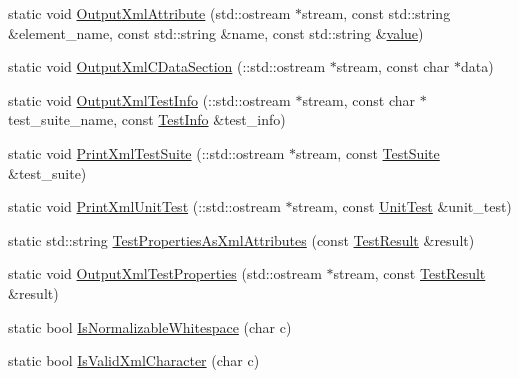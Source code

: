 \begin{DoxyCompactItemize}
static void \mbox{\hyperlink{classtesting_1_1internal_1_1_xml_unit_test_result_printer_a3ace4e5b1866dc7755079e609f046f83}{Output\+Xml\+Attribute}} (std\+::ostream $\ast$stream, const std\+::string \&element\+\_\+name, const std\+::string \&name, const std\+::string \&\mbox{\hyperlink{_obj__test_2lib_2googletest-master_2googlemock_2test_2gmock-matchers__test_8cc_a337b8a670efc0b086ad3af163f3121b6}{value}})
\item 
static void \mbox{\hyperlink{classtesting_1_1internal_1_1_xml_unit_test_result_printer_a0b6f9682a642f88bb779a4f744ad3d92}{Output\+Xml\+C\+Data\+Section}} (\+::std\+::ostream $\ast$stream, const char $\ast$data)
\item 
static void \mbox{\hyperlink{classtesting_1_1internal_1_1_xml_unit_test_result_printer_acf0631ff3bd04b483bf669edc2788617}{Output\+Xml\+Test\+Info}} (\+::std\+::ostream $\ast$stream, const char $\ast$test\+\_\+suite\+\_\+name, const \mbox{\hyperlink{classtesting_1_1_test_info}{Test\+Info}} \&test\+\_\+info)
\item 
static void \mbox{\hyperlink{classtesting_1_1internal_1_1_xml_unit_test_result_printer_a6d86bfb622255dc08c10311da5cb8f04}{Print\+Xml\+Test\+Suite}} (\+::std\+::ostream $\ast$stream, const \mbox{\hyperlink{classtesting_1_1_test_suite}{Test\+Suite}} \&test\+\_\+suite)
\item 
static void \mbox{\hyperlink{classtesting_1_1internal_1_1_xml_unit_test_result_printer_acd8c9f3bd2e7eb1aa4170d61559c1a1a}{Print\+Xml\+Unit\+Test}} (\+::std\+::ostream $\ast$stream, const \mbox{\hyperlink{classtesting_1_1_unit_test}{Unit\+Test}} \&unit\+\_\+test)
\item 
static std\+::string \mbox{\hyperlink{classtesting_1_1internal_1_1_xml_unit_test_result_printer_aa9c9455eb572848d68002e8b9920e32e}{Test\+Properties\+As\+Xml\+Attributes}} (const \mbox{\hyperlink{classtesting_1_1_test_result}{Test\+Result}} \&result)
\item 
static void \mbox{\hyperlink{classtesting_1_1internal_1_1_xml_unit_test_result_printer_a256e5f631f2a729b3992098ae59513e7}{Output\+Xml\+Test\+Properties}} (std\+::ostream $\ast$stream, const \mbox{\hyperlink{classtesting_1_1_test_result}{Test\+Result}} \&result)
\item 
static bool \mbox{\hyperlink{classtesting_1_1internal_1_1_xml_unit_test_result_printer_af9d5af6e5d0c505d5c3bd50a8d2a8d76}{Is\+Normalizable\+Whitespace}} (char c)
\item 
static bool \mbox{\hyperlink{classtesting_1_1internal_1_1_xml_unit_test_result_printer_a2b83a24e3ec8544efa1156f9d6e51873}{Is\+Valid\+Xml\+Character}} (char c)

\end{DoxyCompactItemize}
